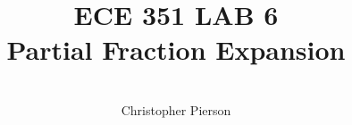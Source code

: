 



\documentclass[12pt]{article}

\usepackage[english]{babel}
\usepackage[utf8x]{inputenc}
\usepackage[T1]{fontenc}
\usepackage{graphicx}
\usepackage{amsmath}
\usepackage{caption}
\usepackage{float}
\usepackage{caption}
\usepackage{subcaption}
\usepackage{rotating}
\usepackage{setspace}

\usepackage[a4paper,top=3cm,bottom=2cm,left=3cm,right=3cm,marginparwidth=1.75cm]{geometry}

\usepackage[colorinlistoftodos]{todonotes}
\usepackage[colorlinks=true, allcolors=blue]{hyperref}
\usepackage{listings}
\usepackage{gensymb}
\usepackage{ mathrsfs }



\title{%
	\textbf{ ECE 351 LAB 6} \\
 Partial Fraction Expansion 
	 }

\author{\\
	Christopher Pierson}

	
	
\vspace{\fill}
\maketitle
\vspace{\fill}
\clearpage

